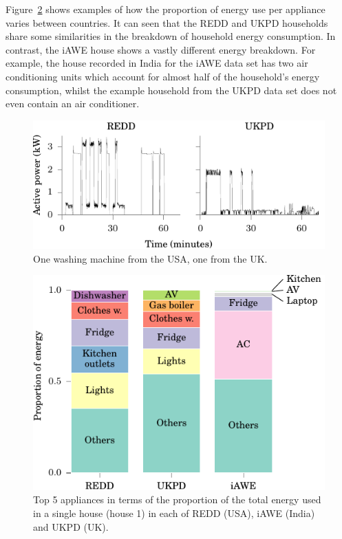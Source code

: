 \documentclass{sig-alternate}
\begin{document}
Figure~\ref{fig:pie} shows examples of how the proportion of energy use per appliance varies between countries. It can seen that the REDD and UKPD households share some similarities in the breakdown of household energy consumption. In contrast, the iAWE house shows a vastly different energy breakdown. For example, the house recorded in India for the iAWE
data set has two air conditioning units which account for almost half of the household's energy consumption, whilst the example household from the UKPD data set does not even contain an air conditioner.

\begin{figure}
  \centering
  \includegraphics[width=\columnwidth]{figures/wm.pdf}
  \caption{One washing machine from the USA, one from the UK.}
  \label{fig:wm}
\end{figure} 

\begin{figure}[t]
 \centering
 \includegraphics[width=\columnwidth]{figures/top_k_appliances_bar.pdf}
 \caption{Top 5 appliances in terms of the proportion of the total
   energy used in a single house (house 1) in each of REDD (USA), iAWE (India) and
   UKPD (UK).}
 \label{fig:pie}
\end{figure}
\end{document}
